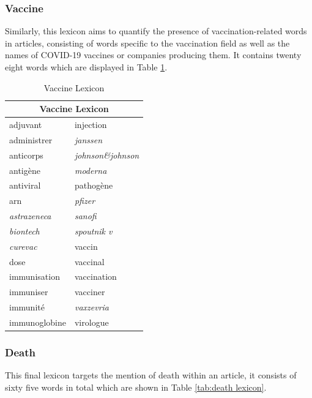 \subsubsection{Vaccine}

Similarly, this lexicon aims to quantify the presence of vaccination-related words in articles, consisting of words specific to the vaccination field as well as the names of COVID-19 vaccines or companies producing them. It contains  twenty eight words which are displayed in Table \ref{tab:vaccine lexicon}.

\begin{table}[H]
\centering
\begin{tabular}{@{}ll@{}}
\toprule
\multicolumn{2}{c}{\textbf{Vaccine Lexicon}} \\ \midrule
adjuvant & injection \\
administrer & \textit{janssen} \\
anticorps & \textit{johnson\&johnson} \\
antigène & \textit{moderna} \\
antiviral & pathogène \\
arn & \textit{pfizer} \\
\textit{astrazeneca} & \textit{sanofi} \\
\textit{biontech} & \textit{spoutnik v} \\
\textit{curevac} & vaccin \\
dose & vaccinal \\
immunisation & vaccination \\
immuniser & vacciner \\
immunité & \textit{vaxzevria} \\
immunoglobine & virologue \\
\bottomrule
\end{tabular}
\caption{Vaccine Lexicon}
\label{tab:vaccine lexicon}
\end{table}

\subsubsection{Death}

This final lexicon targets the mention of death within an article, it consists of sixty five words in total which are shown in Table \ref{tab:death lexicon}.

